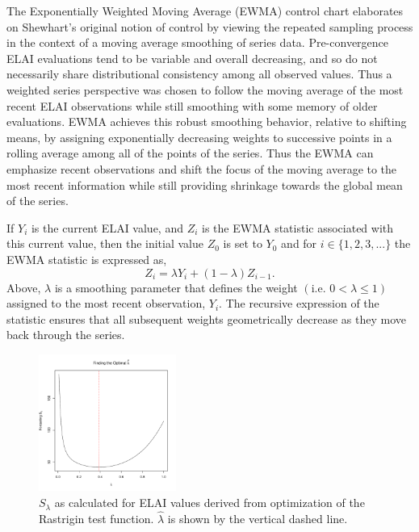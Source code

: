 \documentclass[12pt]{article}
\begin{document}
%
The Exponentially Weighted Moving Average (EWMA) control chart \citep{ewmaPaper, qccPack} elaborates on Shewhart's original notion of control by viewing the repeated sampling process in the context of a moving average smoothing of series data. %
Pre-convergence ELAI evaluations tend to be variable and overall decreasing, and so do not necessarily share distributional consistency among all observed values.  
%
Thus a weighted series perspective was chosen to follow the moving average of the most recent ELAI observations while still smoothing with some memory of older evaluations.
%
EWMA achieves this robust smoothing behavior, relative to shifting means, by assigning exponentially decreasing weights to successive points in a rolling average among all of the points of the series. 
%
Thus the EWMA can emphasize recent observations and shift the focus of the moving average to the most recent information while still providing shrinkage towards the global mean of the series.

%
%

%
If $Y_i$ is the current ELAI value, and $Z_i$ is the EWMA statistic associated with this current value, then the initial value $Z_0$ is set to $Y_0$ and for $i\in\{1, 2, 3, ...\}$ the EWMA statistic is expressed as,
%
\begin{equation}
Z_i=\lambda Y_i+(1-\lambda)Z_{i-1}.
\label{ewmaStat}
\end{equation}
%
Above, $\lambda$ is a smoothing parameter that defines the weight $\left( \text{i.e. }0<\lambda\le1\right)$ assigned to the most recent observation, $Y_i$.
The recursive expression of the statistic ensures that all subsequent weights geometrically decrease as they move back through the series.

\clearpage
%
%
\begin{figure}
\includegraphics[width=0.4\textwidth]{./figures/ssRastHardOpt.pdf}
\caption{ $S_\lambda$ as calculated for ELAI values derived from optimization of the Rastrigin test function. $\hat\lambda$ is shown by the vertical dashed line. }
\label{bestL}
\end{figure}
%
\end{document}
